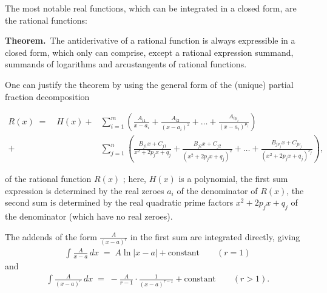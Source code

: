 \documentclass[12pt]{article}
\theoremstyle{definition}
\begin{document}
The most notable real functions, which can be integrated in a closed form, are the rational functions:

\textbf{Theorem.}\, The antiderivative of a rational function is always expressible in a closed form, which only can comprise, except a rational expression summand, summands of logarithms and arcustangents of rational functions.

One can justify the theorem by using the general form of the (unique) partial fraction decomposition

\begin{align*}R(x) \;=\quad H(x)+&
\sum_{i=1}^m\left(\frac{A_{i1}}{x\!-\!a_i}+\frac{A_{i2}}{(x\!-\!a_i)^2}+\ldots
+\frac{A_{i\mu_i}}{(x\!-\!a_i)^{\mu_i}}\right)\\
+&\sum_{j=1}^n\left(\frac{B_{j1}x\!+\!C_{j1}}{x^2\!+\!2p_jx\!+\!q_j}+
\frac{B_{j2}x\!+\!C_{j2}}{( x^2\!+\!2p_jx\!+\!q_j)^2}+\ldots
+\frac{B_{j\nu_j}x\!+\!C_{j\nu_j}}{( x^2\!+\!2p_jx\!+\!q_j)^{\nu_j}}\right)\!,
\end{align*}

of the rational function $R(x)$ ; here, $H(x)$ is a polynomial, the first sum expression is determined by the real zeroes $a_i$ of the denominator of $R(x)$, the second sum is determined by the real quadratic prime factors $x^2\!+\!2p_jx\!+\!q_j$ of the denominator (which have no real zeroes).

The addends of the form $\displaystyle\frac{A}{(x\!-\!a)^r}$ in the first sum are integrated directly, giving
\begin{align}
\int\!\frac{A}{x\!-\!a}\,dx \;=\; A\ln|x\!-\!a|+\mbox{constant} \qquad (r = 1)
\end{align}
and
\begin{align}
\int\!\frac{A}{(x\!-\!a)^r}\,dx \;=\; -\frac{A}{r\!-\!1}\!\cdot\!\frac{1}{(x\!-\!a)^{r-1}}+\mbox{constant} \qquad (r > 1).
\end{align}
\end{document}
